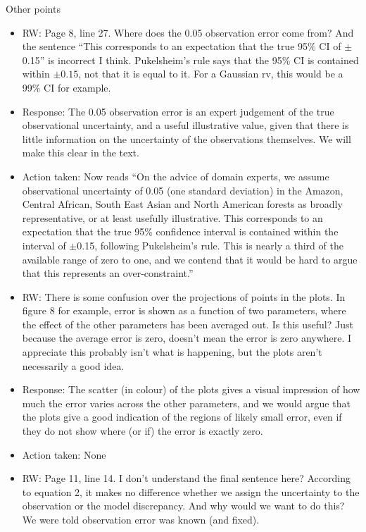 \documentclass[esd, manuscript]{copernicus}
\begin{document}
Other points

\begin{itemize}
\item{RW: Page 8, line 27. Where does the 0.05 observation error come from? And the sentence ``This corresponds to an expectation that the true 95\% CI of
$\pm$0.15'' is incorrect I think. Pukelsheim's rule says that the 95\% CI is contained within $\pm0.15$, not that it is equal to it. For a Gaussian rv, this would be a 99\% CI for example.}

\item{Response: The 0.05 observation error is an expert judgement of the true observational uncertainty, and a useful illustrative value, given that there is little information on the uncertainty of  the observations themselves. We will make this clear in the text.}

\item{Action taken: Now reads ``On the advice of domain experts, we assume observational uncertainty of 0.05 (one standard deviation) in the Amazon, Central African, South East Asian and North American forests as broadly representative, or at least usefully illustrative. This corresponds to an expectation that the true 95\% confidence interval is contained within the interval of $\pm$0.15, following Pukelsheim's rule. This is nearly a third of the available range of zero to one, and we contend that it would be hard to argue that this represents an over-constraint.''}

\item{RW: There is some confusion over the projections of points in the plots. In figure 8 for example, error is shown as a function of two parameters, where the effect of the other parameters has been averaged out. Is this useful? Just because the average error is zero, doesn't mean the error is zero anywhere. I appreciate this probably isn't what is happening, but the plots aren't necessarily a good idea.}

\item{Response: The scatter (in colour) of the plots gives a visual impression of how much the error varies across the other parameters, and we would argue that the plots give a good indication of the regions of likely small error, even if they do not show where (or if) the error is exactly zero.}

\item{Action taken: None}

\item{RW: Page 11, line 14. I don't understand the final sentence here? According to equation 2, it makes no difference whether we assign the uncertainty to the observation or the model discrepancy. And why would we want to do this? We were told observation error was known (and fixed).}


\end{itemize}
\end{document}
